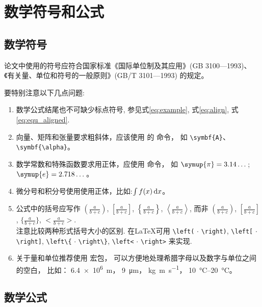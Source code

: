 
\chapter{数学符号和公式}\label{equations}

\section{数学符号}

论文中使用的符号应符合国家标准《国际单位制及其应用》(GB 3100—1993)、《有关量、单位和符号的一般原则》(GB/T 3101—1993) 的规定。

要特别注意以下几点问题:

\begin{enumerate}
\item 数学公式结尾也不可缺少标点符号, 参见式\eqref{eq:example}, 式\eqref{eq:align}, 式\eqref{eq:equ_aligned}.
    \item 向量、矩阵和张量要求粗斜体，应该使用  的  命令，
          如 \verb|\symbf{A}|、\verb|\symbf{\alpha}|。
    \item 数学常数和特殊函数要求用正体，应使用  命令，
    如 $\symup{\pi} = 3.14\dots$; $\symup{e} = 2.718\dots$。
    \item 微分号和积分号使用使用正体，比如:$\int f(x) \mathop{}\!\mathrm{d} x$。
    \item 公式中的括号应写作 $\displaystyle \left(\frac{a}{b + c}\right)$, $\displaystyle \left[\frac{a}{b + c}\right]$, $\displaystyle \left\{\frac{a}{b + c}\right\}$, $\displaystyle \left<\frac{a}{b + c}\right>$, 而非 $\displaystyle (\frac{a}{b + c})$, $\displaystyle [\frac{a}{b + c}]$, $\displaystyle \{\frac{a}{b + c}\}$, $\displaystyle <\frac{a}{b + c}>$.\\
    注意比较两种形式括号大小的区别. 在\LaTeX{}可用 \verb|\left(| $\cdot$ \verb|\right)|, \verb|\left[| $\cdot$ \verb|\right]|, \verb|\left\{| $\cdot$ \verb|\right\}|, \verb|\left<| $\cdot$ \verb|\right>| 来实现.
    \item 关于量和单位推荐使用\href{http://mirrors.ctan.org/macros/latex/contrib/siunitx/siunitx.pdf}{}
宏包，
        可以方便地处理希腊字母以及数字与单位之间的空白，
        比如：
        \SI{6.4e6}{m}，
        \SI{9}{\micro\meter}，
        \si{kg.m.s^{-1}}，
        \SIrange{10}{20}{\degreeCelsius}。
\end{enumerate}

\section{数学公式}

